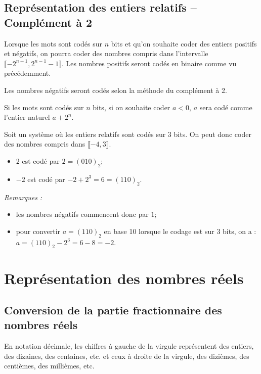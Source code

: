 \subsection{Représentation des entiers relatifs -- Complément à 2}

Lorsque les mots sont codés sur $n$ bits et qu'on souhaite coder des entiers positifs et négatifs, on pourra coder des nombres compris dans l'intervalle $\llbracket-2^{n-1},2^{n-1}-1\rrbracket$. Les nombres positifs seront codés en binaire comme vu précédemment. 

Les nombres négatifs seront codés selon la méthode du complément à 2. 
\begin{methode}
Si les mots sont codés sur $n$ bits, si on souhaite coder $a<0$, $a$ sera codé comme l'entier naturel $a+2^n$. 
\end{methode}

\begin{exemple} 
\begin{multicols}{2}
Soit un système où les entiers relatifs sont codés sur 3 bits. On peut donc coder des nombres compris dans $\llbracket-4,3\rrbracket$.
\begin{itemize}
\item 2 est codé par $2=(010)_2$;
\item $-2$ est codé par $-2+2^3 = 6 = (110)_2$.
\end{itemize}  
\textit{Remarques :}
\begin{itemize}
\item les nombres négatifs commencent donc par $1$;
\item pour convertir $a=(110)_2$ en base 10 lorsque le codage est sur 3 bits, on a :$a= (110)_2 - 2^3 = 6 - 8 = -2$.
\end{itemize}  
\end{multicols}
\end{exemple}
%
\section{Représentation des nombres réels}
\subsection{Conversion de la partie fractionnaire des nombres réels}

En notation décimale, les chiffres à gauche de la virgule représentent des entiers, des dizaines, des centaines, etc. et ceux à droite de la virgule, des dizièmes, des centièmes, des millièmes, etc.


